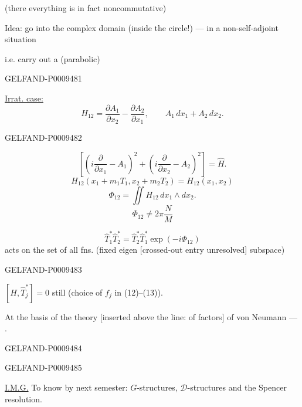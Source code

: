 (there everything is in fact noncommutative)

Idea: go into the complex domain (inside the circle!) --- in a non-self-adjoint situation

i.e. carry out a  (parabolic)

\begin{GelfandAdjacentEvidence}{GELFAND-P000948}{1}

\underline{Irrat. case:}
\[
 H_{12}=\frac{\partial A_1}{\partial x_2}-\frac{\partial A_2}{\partial x_1},
 \qquad A_1\,dx_1+A_2\,dx_2.
\]
\end{GelfandAdjacentEvidence}
\begin{GelfandAdjacentEvidence}{GELFAND-P000948}{2}

\[
 \left[\left(i\frac{\partial}{\partial x_1}-A_1\right)^2+
 \left(i\frac{\partial}{\partial x_2}-A_2\right)^2\right]=\hat H.
\]
\[
 H_{12}(x_1+m_1T_1,x_2+m_2T_2)=H_{12}(x_1,x_2)
\]
\[
 \Phi_{12}=\iint H_{12}\,dx_1\wedge dx_2.
\]
\[
 \Phi_{12}\ne2\pi\frac{N}{M}
\]

\[
 \hat T_1^*\hat T_2^*=\hat T_2^*\hat T_1^*\exp(-i\Phi_{12})
\]
acts on the set of all fns. (fixed eigen [crossed-out entry unresolved] subspace)
\end{GelfandAdjacentEvidence}
\begin{GelfandAdjacentEvidence}{GELFAND-P000948}{3}


$[H,\hat T_j^*]=0$ still (choice of $f_j$ in (12)--(13)).

At the basis of the theory [inserted above the line: of factors] of von Neumann --- .
\end{GelfandAdjacentEvidence}
\begin{GelfandAdjacentEvidence}{GELFAND-P000948}{4}

\end{GelfandAdjacentEvidence}
\begin{GelfandAdjacentEvidence}{GELFAND-P000948}{5}


\underline{I.M.G.} To know by next semester: $G$-structures, $\mathcal D$-structures and the Spencer resolution.
\end{GelfandAdjacentEvidence}


